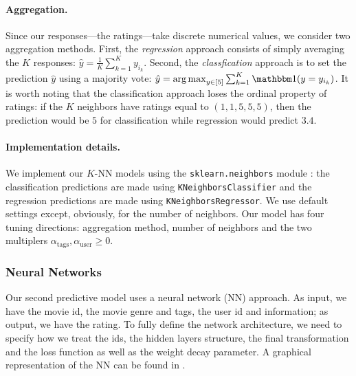 \documentclass[bj, preprint]{imsart}
\begin{document}
\paragraph{Aggregation.}\label{par:method.models.knn.agg}

Since our responses---the ratings---take discrete numerical values, we consider two aggregation methods. First, the \textit{regression} approach consists of simply averaging the $K$ responses: $\hat{y} = \frac 1K \sum_{k=1}^{K} y_{i_k}$. Second, the \textit{classfication} approach is to set the prediction $\hat{y}$ using a majority vote: $\hat{y} = \argmax_{y\in[5]}\sum_{k=1}^{K} \ind(y=y_{i_k})$. It is worth noting that the classification approach loses the ordinal property of ratings: if the $K$ neighbors have ratings equal to $(1,1,5,5,5)$, then the prediction would be $5$ for classification while regression would predict $3.4$.

\paragraph{Implementation details.}\label{par:method.models.knn.impl}

We implement our $K$-NN models using the \texttt{sklearn.neighbors} module \citep{scikit-learn}: the classification predictions are made using \texttt{KNeighborsClassifier} and the regression predictions are made using \texttt{KNeighborsRegressor}. We use default settings except, obviously, for the number of neighbors. Our model has four tuning directions: aggregation method, number of neighbors and the two multiplers $\alpha_\text{tags},\alpha_\text{user}\geqslant 0$.

\subsubsection{Neural Networks}\label{subsubsec:method.models.nn}

Our second predictive model uses a neural network (NN) approach. As input, we have the movie id, the movie genre and tags, the user id and information; as output, we have the rating. 
To fully define the network architecture, we need to specify how we treat the ids, the hidden layers structure, the final transformation and the loss function as well as the weight decay parameter. 
A graphical representation of the NN can be found in .
\end{document}
